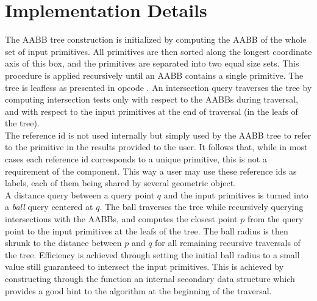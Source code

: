 \section{Implementation Details}
\label{AABB_tree_section_details}

The AABB tree construction is initialized by computing the AABB of the whole set of input primitives. All primitives are then sorted along the longest coordinate axis of this box, and the primitives are separated into two equal size sets. This procedure is applied recursively until an AABB contains a single primitive. The tree is leafless as presented in {\sc opcode} \cite{cgal:t-ocdl-05}. An intersection query traverses the tree by computing intersection tests only with respect to the AABBs during traversal, and with respect to the input primitives at the end of traversal (in the leafs of the tree).\\

The reference id is not used internally but simply used by the AABB tree to refer to the primitive in the results provided to the user. It follows that, while in most cases each reference id corresponds to a unique primitive, this is not a requirement of the component. This way a user may use these reference ids as labels, each of them being shared by several geometric object. \\

A distance query between a query point $q$ and the input primitives is turned into a \emph{ball} query centered at $q$. The ball traverses the tree while recursively querying intersections with the AABBs, and computes the closest point $p$ from the query point to the input primitives at the leafs of the tree. The ball radius is then shrunk to the distance between $p$ and $q$ for all remaining recursive traversals of the tree. Efficiency is achieved through setting the initial ball radius to a small value still guaranteed to intersect the input primitives. This is achieved by constructing through the function  an internal secondary data structure which provides a good hint to the algorithm at the beginning of the traversal.



